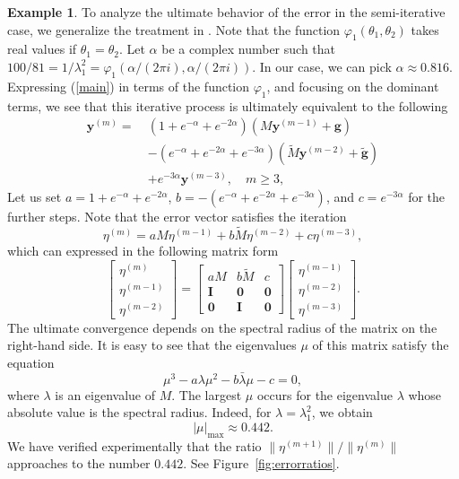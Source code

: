 \documentclass[reqno]{amsart}
\newcommand{\mb}{\mathbf}
\numberwithin{equation}{section}
\theoremstyle{plain}
\theoremstyle{definition}
\newtheorem{example}{Example}
\begin{document}
\begin{example}
To analyze the ultimate behavior of the error in the semi-iterative case, we generalize the treatment in \cite[7.6]{foxparker}. Note that the function $\varphi_1(\theta_1,\theta_2)$ takes real values if $\theta_1=\theta_2$. Let $\alpha$ be a complex number such that $100/81=1/\lambda_1^2=\varphi_1 (\alpha/(2\pi i),\alpha/(2\pi i))$. In our case, we can pick 
$\alpha \approx 0.816$. Expressing (\ref{main}) in terms of the function $\varphi_1$, and focusing on the dominant terms, we see that this iterative process is ultimately equivalent to the following 
\begin{align*}\label{main-v2}		
	\mb{y}^{(m)}=\ &(1+e^{-\alpha}+e^{-2\alpha})\left( M\mb{y}^{(m-1)} + \mb{g} \right) \\
	& -(e^{-\alpha}+e^{-2\alpha}+e^{-3\alpha})\left( \widetilde{M}\mb{y}^{(m-2)} + \widetilde{\mb{g}} \right)\\
	& +e^{-3\alpha}\mb{y}^{(m-3)}, \quad m\geq 3,
\end{align*}
Let us set $a=1+e^{-\alpha}+e^{-2\alpha}$, $b=-(e^{-\alpha}+e^{-2\alpha}+e^{-3\alpha})$, and $c=e^{-3\alpha}$ for the further steps. Note that the error vector satisfies the iteration 
\begin{equation*}\label{main-v4}
	\eta^{(m)} = aM\eta^{(m-1)} + b\widetilde{M}\eta^{(m-2)} +  c\eta^{(m-3)},
\end{equation*}
which can expressed in the following matrix form
\[\left[\begin{array}{c}
	\eta^{(m)}\\\eta^{(m-1)}\\\eta^{(m-2)}
\end{array}\right] = \left[\begin{array}{ccc}
	aM& b\widetilde{M}&c\\\mb{I}&\mb{0}&\mb{0} \\ \mb{0}&\mb{I}&\mb{0}
\end{array}\right] \left[\begin{array}{c}
	\eta^{(m-1)}\\ \eta^{(m-2)}\\ \eta^{(m-3)}
\end{array}\right].\]
The ultimate convergence depends on the spectral radius of the matrix on the right-hand side. It is easy to see that the eigenvalues $\mu$ of this matrix satisfy the equation
\begin{equation}\label{polyeqn}
\mu^3- a\lambda\mu^2  -b\bar{\lambda}\mu - c=0,
\end{equation}
where $\lambda$ is an eigenvalue of $M$. The largest $\mu$ occurs for the eigenvalue $\lambda$ whose absolute value is the spectral radius. Indeed, for $\lambda=\lambda_1^2$, we obtain $$|\mu|_\text{max} \approx 0.442.$$ 
We have verified experimentally that the ratio $\lVert\eta^{(m+1)}\rVert / \lVert\eta^{(m)}\rVert$ approaches to the number $0.442$. See Figure~\ref{fig:errorratios}.


\end{example}
\end{document}
